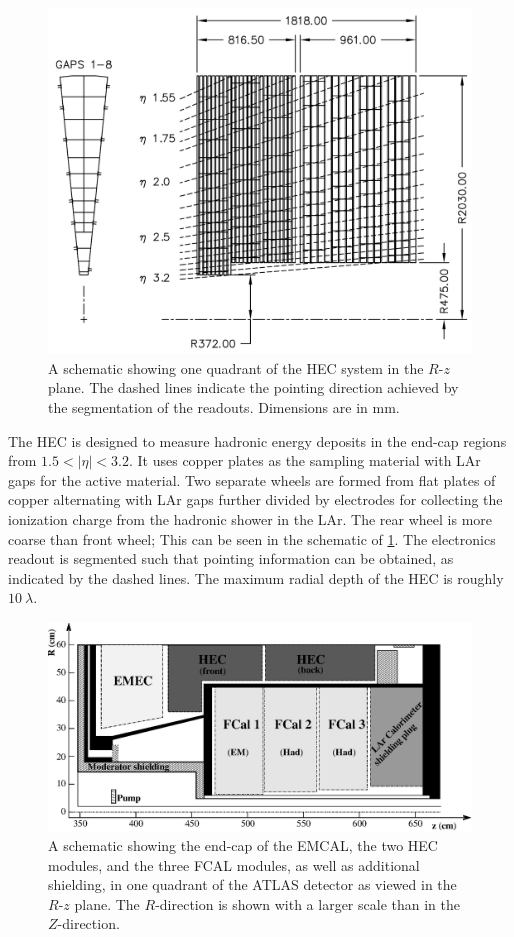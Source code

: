 \begin{figure}[ht] 
\centering
\includegraphics[width=.7\textwidth]{figures/atlas/hec.pdf}
\caption{ A schematic showing one quadrant of the 
HEC system in the $R$-$z$ plane. The dashed lines indicate
the pointing direction achieved by the segmentation of the 
readouts.  Dimensions are in mm.  }
\label{fig:atlas_hec}
\end{figure}


The HEC is designed to measure hadronic energy deposits in the 
end-cap regions from $1.5 < |\eta|< 3.2$. It uses 
copper plates as the sampling material with LAr gaps
for the active material. Two separate wheels are formed from
flat plates of copper alternating with LAr gaps further divided by electrodes for
collecting the ionization charge from the hadronic shower in the LAr.
The rear wheel is more coarse than front wheel;
This can be seen in the schematic of \fig\ref{fig:atlas_hec}.
The electronics readout is segmented such that pointing information
can be obtained, as indicated by the dashed lines.
The maximum radial depth of the HEC is roughly $10~\lambda$.



\begin{figure}[ht] 
\centering
\includegraphics[width=.7\textwidth]{figures/atlas/fcal.eps}
\caption{ A schematic showing the end-cap of the EMCAL,
the two HEC modules, and the three FCAL modules, as well
as additional shielding, in one
quadrant of the ATLAS detector as viewed 
in the $R$-$z$ plane.
The $R$-direction is shown with a larger scale than in the $Z$-direction.
}
\label{fig:atlas_fcal}
\end{figure}



